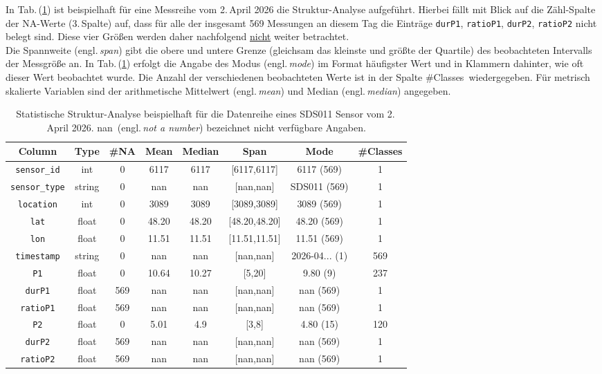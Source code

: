 In Tab.\,(\ref{Tab_Statistsiche_Analyse_Sensor_20260402}) ist beispielhaft 
für eine Messreihe vom 2.\,April 2026 die Struktur-Analyse aufgeführt. Hierbei
fällt mit Blick auf die Zähl-Spalte der NA-Werte (3.\,Spalte) auf, dass für 
alle der insgesamt 569 Messungen an diesem Tag die Einträge
\texttt{durP1}, \texttt{ratioP1}, \texttt{durP2}, \texttt{ratioP2} nicht 
belegt sind. Diese vier Größen werden daher nachfolgend \underline{nicht}
weiter betrachtet. \\
Die Spannweite (engl.\,\textit{span}) gibt die obere und untere Grenze 
(gleichsam das kleinste und größte der Quartile) des beobachteten
Intervalls der Messgröße an. In 
Tab.\,(\ref{Tab_Statistsiche_Analyse_Sensor_20260402}) erfolgt die Angabe des Modus (engl.\,\textit{mode})
im Format häufigster Wert und in Klammern dahinter, wie oft dieser Wert beobachtet wurde. Die Anzahl der verschiedenen beobachteten Werte ist in 
der Spalte \glqq \#Classes\grqq\ wiedergegeben. 
Für metrisch skalierte Variablen sind der arithmetische Mittelwert (engl.\,\textit{mean}) und
Median (engl.\,\textit{median}) angegeben.

\begin{table}[H]
\begin{tabular}{cccccccc}
\hline
Column      & Type   &   \#NA &    Mean &   Median & Span & Mode &   \#Classes \\
\hline \hline
\texttt{sensor\_id} & int & 0 & 6117 &  6117 & [6117,6117] & 6117 (569) & 1 \\
\texttt{sensor\_type} & string & 0 &  nan & nan & [nan,nan] & SDS011 (569) & 1 \\
\texttt{location} & int & 0 & 3089 & 3089 & [3089,3089] & 3089 (569) & 1 \\
\texttt{lat} & float & 0 & 48.20 & 48.20 & [48.20,48.20] & 48.20 (569) & 1 \\
\texttt{lon} & float & 0 & 11.51 & 11.51 & [11.51,11.51] & 11.51 (569) & 1 \\
\texttt{timestamp} & string & 0 & nan &   nan & [nan,nan] & 2026-04... (1) & 569 \\
\texttt{P1} & float  & 0 & 10.64 & 10.27 & [5,20] & 9.80 (9) & 237 \\
\texttt{durP1} & float  & 569 & nan & nan & [nan,nan] & nan (569) & 1 \\
\texttt{ratioP1} & float  & 569 &  nan & nan & [nan,nan] & nan (569) & 1 \\
\texttt{P2} & float  & 0 & 5.01 & 4.9  & [3,8] & 4.80 (15) & 120 \\
\texttt{durP2} & float  & 569 & nan & nan & [nan,nan] & nan (569) & 1 \\
\texttt{ratioP2} & float  & 569 & nan & nan & [nan,nan] & nan (569) & 1 \\
\hline
\end{tabular}
\caption{Statistische Struktur-Analyse beispielhaft für die
Datenreihe eines SDS011 Sensor vom 2.\,April 2026. 
\glqq nan\grqq\ (engl.\,\textit{not a number}) bezeichnet
nicht verfügbare Angaben.}
\label{Tab_Statistsiche_Analyse_Sensor_20260402}
\end{table}

